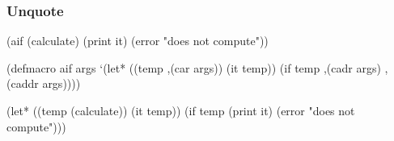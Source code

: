 \documentclass[hyperref={bookmarks=false}]{beamer}
\begin{document}
\begin{frame}[fragile]
\frametitle{Unquote}
\begin{semiverbatim}
(aif (calculate)
  (print it)
  (error "does not compute"))

(defmacro aif args
  \alert{     `}(let*            ((temp \alert{,(car args)})
                          (it  temp))
          (if  temp
            \alert{,(cadr args)}
            \alert{,(caddr args)})))

(let* ((temp (calculate))
       (it temp))
  (if temp
    (print it)
    (error "does not compute")))
\end{semiverbatim}
\end{frame}
\end{document}
